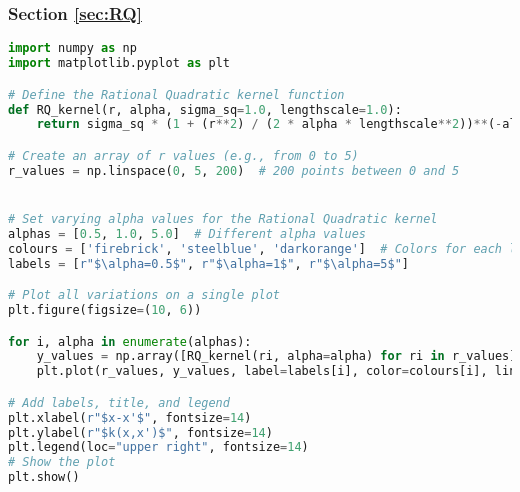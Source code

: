 \documentclass[12pt,a4paper]{article}
\begin{document}
\subsubsection{Section \ref{sec:RQ}}






\vspace{10pt}
\begin{lstlisting}[language=python, caption={Code of the Creation of Figures \ref{fig:RQ_PriorDist plot}}]
import numpy as np
import matplotlib.pyplot as plt

# Define the Rational Quadratic kernel function
def RQ_kernel(r, alpha, sigma_sq=1.0, lengthscale=1.0):
    return sigma_sq * (1 + (r**2) / (2 * alpha * lengthscale**2))**(-alpha)

# Create an array of r values (e.g., from 0 to 5)
r_values = np.linspace(0, 5, 200)  # 200 points between 0 and 5


# Set varying alpha values for the Rational Quadratic kernel
alphas = [0.5, 1.0, 5.0]  # Different alpha values
colours = ['firebrick', 'steelblue', 'darkorange']  # Colors for each line
labels = [r"$\alpha=0.5$", r"$\alpha=1$", r"$\alpha=5$"]

# Plot all variations on a single plot
plt.figure(figsize=(10, 6))

for i, alpha in enumerate(alphas):
    y_values = np.array([RQ_kernel(ri, alpha=alpha) for ri in r_values])
    plt.plot(r_values, y_values, label=labels[i], color=colours[i], linewidth=3)

# Add labels, title, and legend
plt.xlabel(r"$x-x'$", fontsize=14)
plt.ylabel(r"$k(x,x')$", fontsize=14)
plt.legend(loc="upper right", fontsize=14)
# Show the plot
plt.show()
\end{lstlisting}
\end{document}
